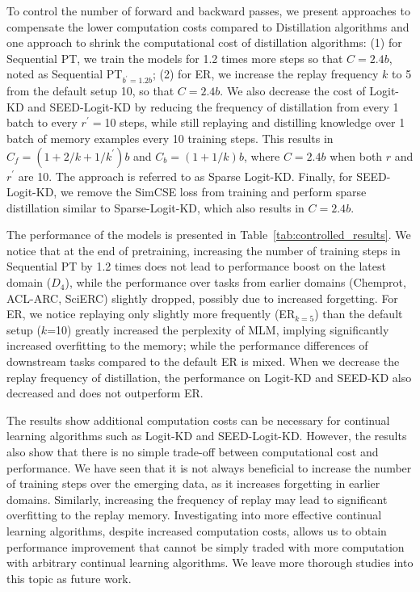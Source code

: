To control the number of forward and backward passes, we present approaches to compensate the lower computation costs compared to Distillation algorithms and one approach to shrink the computational cost of distillation algorithms: (1) for Sequential PT, we train the models for 1.2 times more steps so that $C=2.4b$, noted as Sequential PT$_{b^\prime=1.2b}$; (2) for ER, we increase the replay frequency $k$ to 5 from the default setup 10, so that $C=2.4b$. We also decrease the cost of Logit-KD and SEED-Logit-KD by reducing the frequency of distillation from every 1 batch to every $r^\prime=$10 steps, while still replaying and distilling knowledge over 1 batch of memory examples every 10 training steps. This results in $C_f=(1+2/k+1/k^\prime)b$ and $C_b=(1+1/k)b$, where $C=2.4b$ when both $r$ and $r^\prime$ are 10. The approach is referred to as Sparse Logit-KD. Finally, for SEED-Logit-KD, we remove the SimCSE loss from training and perform sparse distillation similar to Sparse-Logit-KD, which also results in $C=2.4b$.

The performance of the models is presented in Table~\ref{tab:controlled_results}. We notice that at the end of pretraining, increasing the number of training steps in Sequential PT by 1.2 times does not lead to performance boost on the latest domain ($D_4$), while the performance over tasks from earlier domains (Chemprot, ACL-ARC, SciERC) slightly dropped, possibly due to increased forgetting. For ER, we notice replaying only slightly more frequently (ER$_{k=5}$) than the default setup ($k$=10) greatly increased the perplexity of MLM, implying significantly increased overfitting to the memory; while the performance differences of downstream tasks compared to the default ER is mixed. When we decrease the replay frequency of distillation, the performance on Logit-KD and SEED-KD also decreased and does not outperform ER.

The results show additional computation costs can be necessary for continual learning algorithms such as Logit-KD and SEED-Logit-KD. However, the results also show that there is no simple trade-off between computational cost and performance. We have seen that it is not always beneficial to increase the number of training steps over the emerging data, as it increases forgetting in earlier domains. Similarly, increasing the frequency of replay may lead to significant overfitting to the replay memory. Investigating into more effective continual learning algorithms, despite increased computation costs, allows us to obtain performance improvement that cannot be simply traded with more computation with arbitrary continual learning algorithms.  We leave more thorough studies into this topic as future work.

